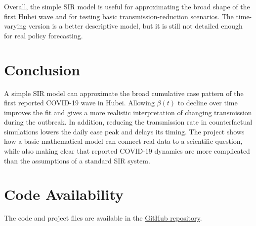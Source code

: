 \documentclass[11pt]{article}
\begin{document}
Overall, the simple SIR model is useful for approximating the broad shape of the first Hubei wave and for testing basic transmission-reduction scenarios. The time-varying version is a better descriptive model, but it is still not detailed enough for real policy forecasting.

\section{Conclusion}

A simple SIR model can approximate the broad cumulative case pattern of the first reported COVID-19 wave in Hubei. Allowing $\beta(t)$ to decline over time improves the fit and gives a more realistic interpretation of changing transmission during the outbreak. In addition, reducing the transmission rate in counterfactual simulations lowers the daily case peak and delays its timing. The project shows how a basic mathematical model can connect real data to a scientific question, while also making clear that reported COVID-19 dynamics are more complicated than the assumptions of a standard SIR system.

\section*{Code Availability}

The code and project files are available in the \href{https://github.com/Hans-Yin/Intro-to-Math-Modeling-Final-Project/}{GitHub repository}.



\end{document}
